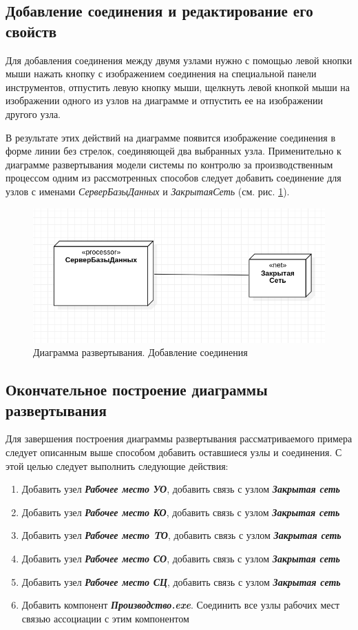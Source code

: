 \documentclass[a4paper,12pt]{report}
\begin{document}
\subsection*{Добавление соединения и редактирование его свойств}
Для добавления соединения между двумя узлами нужно с помощью левой кнопки мыши нажать кнопку с изображением соединения на специальной панели инструментов, отпустить левую кнопку мыши, щелкнуть левой кнопкой мыши на изображении одного из узлов на диаграмме и отпустить ее на изображении другого узла. 

В результате этих действий на диаграмме появится изображение соединения в форме линии без стрелок, соединяющей два выбранных узла. Применительно к диаграмме развертывания модели системы по контролю за производственным процессом одним из рассмотренных способов следует добавить соединение для узлов с именами \textit{СерверБазыДанных} и \textit{ЗакрытаяСеть} (см. рис. \ref{fig:deployementbuscycle}).
\begin{figure}[h!]
	\centering
	\includegraphics[width=0.5\linewidth]{images/deployementbuscycle}
	\caption{Диаграмма развертывания. Добавление соединения}
	\label{fig:deployementbuscycle}
\end{figure}

\subsection*{Окончательное построение диаграммы развертывания}
Для завершения построения диаграммы развертывания рассматриваемого примера следует описанным выше способом добавить оставшиеся узлы и соединения. С этой целью следует выполнить следующие действия:
\begin{enumerate}
	\item Добавить узел \textit{\textbf{Рабочее место УО}}, добавить связь с узлом \textit{\textbf{Закрытая сеть}}
	
	\item Добавить узел \textit{\textbf{Рабочее место КО}}, добавить связь с узлом \textit{\textbf{Закрытая сеть}}
	
	\item Добавить узел \textit{\textbf{Рабочее место TО}}, добавить связь с узлом \textit{\textbf{Закрытая сеть}}
	
	\item Добавить узел \textit{\textbf{Рабочее место СО}}, добавить связь с узлом \textit{\textbf{Закрытая сеть}}
	
	\item Добавить узел \textit{\textbf{Рабочее место СЦ}}, добавить связь с узлом \textit{\textbf{Закрытая сеть}}
	\item Добавить компонент \textit{\textbf{Производство.exe}}. Соединить все узлы рабочих мест связью ассоциации с этим компонентом
\end{enumerate}
\end{document}
